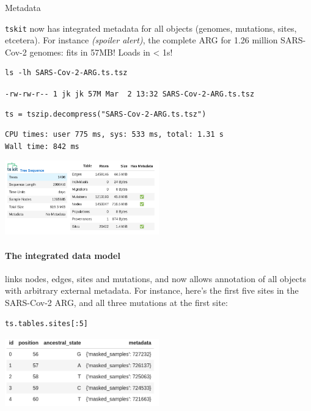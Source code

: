 \documentclass[landscape,a0paper,fontscale=0.5]{baposter}
\newcommand{\tskit}{{\texttt{tskit}}}
\begin{document}
\begin{poster}
\begin{posterbox}[name=inout,column=0,span=1]{Metadata}

    \tskit{} now has integrated metadata
    for all objects (genomes, mutations, sites, etcetera).
    For instance \emph{(spoiler alert)},
    the complete ARG for 1.26 million SARS-Cov-2 genomes: fits in 57MB!
    Loads in < 1s!

\begin{verbatim}
ls -lh SARS-Cov-2-ARG.ts.tsz
\end{verbatim}
{\scriptsize \verb|-rw-rw-r-- 1 jk jk 57M Mar  2 13:32 SARS-Cov-2-ARG.ts.tsz|}
\begin{verbatim}
ts = tszip.decompress("SARS-Cov-2-ARG.ts.tsz")
\end{verbatim}
{\scriptsize
\begin{verbatim}
CPU times: user 775 ms, sys: 533 ms, total: 1.31 s
Wall time: 842 ms
\end{verbatim}
}
\includegraphics[width=0.5\textwidth]{sc2_ts.png}

\paragraph{The integrated data model}
links nodes, edges, sites and mutations,
and now allows annotation of all objects with arbitrary external metadata.
For instance,
here's the first five sites in the SARS-Cov-2 ARG,
and all three mutations at the first site:

\begin{multicols}{2}
\begin{verbatim}
ts.tables.sites[:5]
\end{verbatim}
\includegraphics[width=0.5\textwidth]{sc2_sites}


\end{multicols}
\end{posterbox}
\end{poster}
\end{document}
